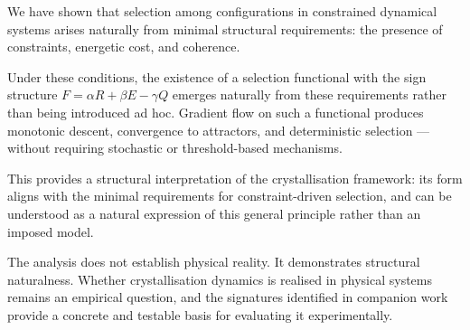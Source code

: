 \documentclass[12pt]{article}
\begin{document}
We have shown that selection among configurations in constrained dynamical systems arises naturally from minimal structural requirements: the presence of constraints, energetic cost, and coherence.

Under these conditions, the existence of a selection functional with the sign structure $F = \alpha R + \beta E - \gamma Q$ emerges naturally from these requirements rather than being introduced ad hoc. Gradient flow on such a functional produces monotonic descent, convergence to attractors, and deterministic selection --- without requiring stochastic or threshold-based mechanisms.

This provides a structural interpretation of the crystallisation framework: its form aligns with the minimal requirements for constraint-driven selection, and can be understood as a natural expression of this general principle rather than an imposed model.

The analysis does not establish physical reality. It demonstrates structural naturalness. Whether crystallisation dynamics is realised in physical systems remains an empirical question, and the signatures identified in companion work provide a concrete and testable basis for evaluating it experimentally.



\end{document}
